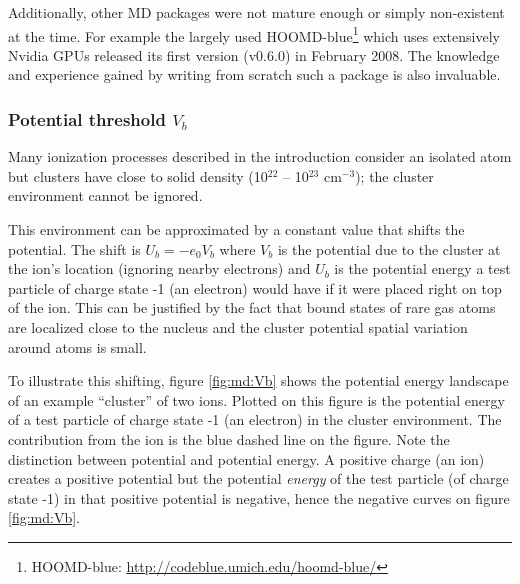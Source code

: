 Additionally, other MD packages were not mature enough or simply non-existent at the time.
For example the largely used HOOMD-blue\footnote{HOOMD-blue:
\url{http://codeblue.umich.edu/hoomd-blue/}} which uses extensively
Nvidia GPUs released its first version (v0.6.0) in February 2008.
The knowledge and experience gained by writing from scratch such
a package is also invaluable.




\subsubsection{Potential threshold $V_b$}
\label{section:intro:Vb}

Many ionization processes described in the introduction
consider an isolated atom but
clusters have close to solid density (10$^{22}$ -- 10$^{23}$ cm$^{-3}$);
the cluster environment cannot be ignored.

This environment can be approximated by a constant value that shifts the
potential\cite{Fennel2007}. The shift is $U_b = -e_0 V_b$ where $V_b$ is the
potential due to the cluster at the ion's location (ignoring nearby electrons)
and $U_b$ is the potential energy a test particle of charge state -1 (an electron)
would have if it were placed right on top of the ion. This can be justified by
the fact that bound states of rare gas atoms are localized close to the nucleus
and the cluster potential spatial variation around atoms is small.

To illustrate this shifting, figure \ref{fig:md:Vb} shows the potential energy
landscape of an example ``cluster'' of two ions. Plotted on this figure is the
potential energy of a test particle of charge state -1 (an electron) in the
cluster environment. The contribution from the ion is the blue dashed line on the
figure. Note the distinction between potential and potential
energy. A positive charge (an ion) creates a positive potential but the
potential \textit{energy} of the test particle (of charge state -1) in that
positive potential is negative, hence the negative curves on figure
\ref{fig:md:Vb}.



